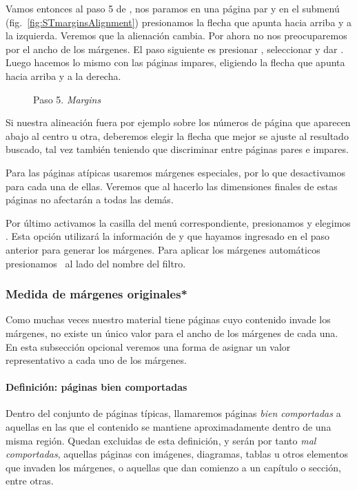 \documentclass[%
	a5paper,
	10pt,
	twoside,
	openright,
	final,
]{memoir}
\begin{document}
{	Vamos entonces al paso 5 de \scantailor, nos paramos en una página par y en el submenú  (fig.~\ref{fig:STmarginsAlignment}) presionamos la flecha que apunta hacia arriba y a la izquierda. Veremos que la alienación cambia. Por ahora no nos preocuparemos por el ancho de los márgenes. El paso siguiente es presionar , seleccionar  y dar . Luego hacemos lo mismo con las páginas impares, eligiendo la flecha que apunta hacia arriba y a la derecha.

	\begin{figure}
		\hfill
		\caption{Paso 5. \emph{Margins}\label{fig:STmargins}}
	\end{figure}

	Si nuestra alineación fuera por ejemplo sobre los números de página que aparecen abajo al centro u otra, deberemos elegir la flecha que mejor se ajuste al resultado buscado, tal vez también teniendo que discriminar entre páginas pares e impares.

	Para las páginas atípicas usaremos márgenes especiales, por lo que desactivamos  para cada una de ellas. Veremos que al hacerlo las dimensiones finales de estas páginas no afectarán a todas las demás.

	Por último activamos la casilla  del menú correspondiente, presionamos  y elegimos . Esta opción utilizará la información de  y  que hayamos ingresado en el paso anterior para generar los márgenes. Para aplicar los márgenes automáticos presionamos \play\ al lado del nombre del filtro.

	\subsubsection{Medida de márgenes originales*} Como muchas veces nuestro material tiene páginas cuyo contenido invade los márgenes, no existe un único valor para el ancho de los márgenes de cada una. En esta subsección opcional veremos una forma de asignar un valor representativo a cada uno de los márgenes.

	\paragraph{Definición: páginas bien comportadas} Dentro del conjunto de páginas típicas, llamaremos páginas \emph{bien comportadas} a aquellas en las que el contenido se mantiene aproximadamente dentro de una misma región. Quedan excluidas de esta definición, y serán por tanto \emph{mal comportadas}, aquellas páginas con imágenes, diagramas, tablas u otros elementos que invaden los márgenes, o aquellas que dan comienzo a un capítulo o sección, entre otras.

}
\end{document}
